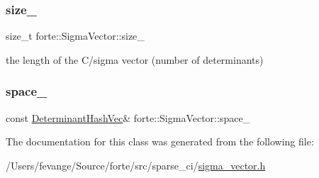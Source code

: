 \mbox{\label{classforte_1_1_sigma_vector_a3d02c40d09db96f9779d3e8728704fae}} 
\subsubsection{\texorpdfstring{size\+\_\+}{size\_}}
{\footnotesize\ttfamily size\+\_\+t forte\+::\+Sigma\+Vector\+::size\+\_\+\hspace{0.3cm}{\ttfamily [protected]}}



the length of the C/sigma vector (number of determinants) 

\mbox{\label{classforte_1_1_sigma_vector_ab7289d3fcf1eb43b62b8b64b86bbf6aa}} 
\subsubsection{\texorpdfstring{space\+\_\+}{space\_}}
{\footnotesize\ttfamily const \mbox{\hyperlink{classforte_1_1_determinant_hash_vec}{Determinant\+Hash\+Vec}}\& forte\+::\+Sigma\+Vector\+::space\+\_\+\hspace{0.3cm}{\ttfamily [protected]}}



The documentation for this class was generated from the following file\+:\begin{DoxyCompactItemize}
\item 
/\+Users/fevange/\+Source/forte/src/sparse\+\_\+ci/\mbox{\hyperlink{sigma__vector_8h}{sigma\+\_\+vector.\+h}}\end{DoxyCompactItemize}
